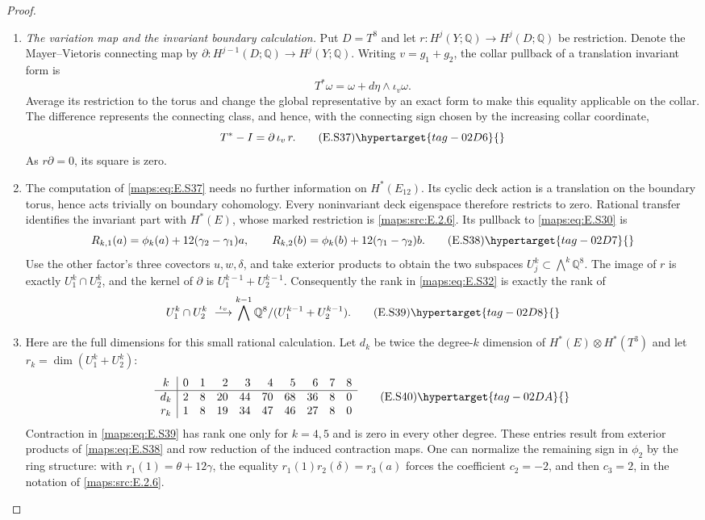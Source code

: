 \begin{proof}
\begin{enumerate}[label={$\langle1\rangle$\arabic*.},leftmargin=*]
\item \emph{The variation map and the invariant boundary calculation.}
Put $D=T^8$ and let $r:H^j(Y;\mathbb Q)\to H^j(D;\mathbb Q)$
be restriction. Denote the Mayer--Vietoris connecting map
by $\partial:H^{j-1}(D;\mathbb Q)\to H^j(Y;\mathbb Q)$.
Writing $v=g_1+g_2$, the collar pullback of a translation
invariant form is
\[
       T^*\omega=\omega+d\eta\wedge\iota_v\omega.
\]
Average its restriction to the torus and change the global
representative by an exact form to make this equality
applicable on the collar. The difference represents the
connecting class, and hence, with the connecting sign
chosen by the increasing collar coordinate,
\[
                          T^*-I=\partial\,\iota_v\,r.
 \tag{E.S37}\hypertarget{tag-02D6}{}\label{maps:eq:E.S37}
\]
As $r\partial=0$, its square is zero.

\item The computation of \eqref{maps:eq:E.S37} needs no further information on $H^*(E_{12})$. Its cyclic deck action is a translation on the
boundary torus, hence acts trivially on boundary cohomology.
Every noninvariant deck eigenspace therefore restricts to
zero. Rational transfer identifies the invariant part
with $H^*(E)$, whose marked restriction is \ref{maps:src:E.2.6}. Its
pullback to \eqref{maps:eq:E.S30} is
\[
 R_{k,1}(a)=\phi_k(a)+12(\gamma_2-\gamma_1)a,
 \qquad
 R_{k,2}(b)=\phi_k(b)+12(\gamma_1-\gamma_2)b.
 \tag{E.S38}\hypertarget{tag-02D7}{}\label{maps:eq:E.S38}
\]
Use the other factor's three covectors $u,w,\delta$,
and take exterior products to obtain the two subspaces
$U_j^k\subset\bigwedge^k\mathbb Q^8$.
The image of $r$ is exactly $U_1^k\cap U_2^k$, and the
kernel of $\partial$ is $U_1^{k-1}+U_2^{k-1}$.
Consequently the rank in \eqref{maps:eq:E.S32} is exactly the rank of
\[
 U_1^k\cap U_2^k\ \stackrel{\iota_v}{\longrightarrow}
 \bigwedge^{k-1}\mathbb Q^8/(U_1^{k-1}+U_2^{k-1}).
 \tag{E.S39}\hypertarget{tag-02D8}{}\label{maps:eq:E.S39}
\]

\item Here are the full dimensions for this small rational
calculation. Let $d_k$ be twice the degree-$k$ dimension
of $H^*(E)\otimes H^*(T^3)$ and let
$r_k=\dim(U_1^k+U_2^k)$:
\[
 \begin{array}{c|rrrrrrrrr}
 k&0&1&2&3&4&5&6&7&8\\ \hline
 d_k&2&8&20&44&70&68&36&8&0\\
 r_k&1&8&19&34&47&46&27&8&0
 \end{array}
 \tag{E.S40}\hypertarget{tag-02DA}{}\label{maps:eq:E.S40}
\]
Contraction in \eqref{maps:eq:E.S39} has rank one only for
$k=4,5$ and is zero in every other degree. These entries result from exterior products of \eqref{maps:eq:E.S38}
and row reduction of the induced contraction maps. One can normalize the remaining sign in
$\phi_2$ by the ring structure: with
$r_1(1)=\theta+12\gamma$, the equality
$r_1(1)r_2(\delta)=r_3(a)$ forces the coefficient
$c_2=-2$, and then $c_3=2$, in the notation of \ref{maps:src:E.2.6}.




\end{enumerate}
\end{proof}
